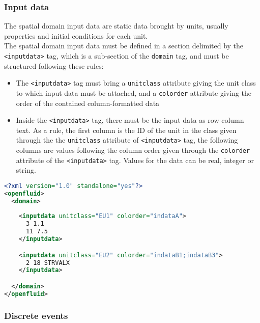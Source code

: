 \subsubsection{Input data}

The spatial domain input data are static data brought by units, usually properties and initial conditions for each unit.\\
\noindent The spatial domain input data must be defined in a section delimited
by the \texttt{<inputdata>} tag, which is a sub-section of the \texttt{domain}
tag, and must be structured following these rules:
\begin{itemize}
  \item The \texttt{<inputdata>} tag must bring a \texttt{unitclass}
  attribute giving the unit class to which input data must be attached, and a
  \texttt{colorder} attribute giving the order of the contained column-formatted
  data
  \item Inside the \texttt{<inputdata>} tag, there must be the input data as 
  row-column text. As a rule, the first column is the ID of the unit in the class
  given through the the \texttt{unitclass} attribute of \texttt{<inputdata>}
  tag, the following columns are values following the column order given
  through the \texttt{colorder} attribute of the \texttt{<inputdata>} tag.
  Values for the data can be real, integer or string.
\end{itemize}

\bigskip

\begin{lstlisting}[language=xml,title=\footnotesize\textit{example}]
<?xml version="1.0" standalone="yes"?>
<openfluid>
  <domain>
  
    <inputdata unitclass="EU1" colorder="indataA">
      3 1.1
      11 7.5
    </inputdata>

    <inputdata unitclass="EU2" colorder="indataB1;indataB3">
      2 18 STRVALX
    </inputdata>

  </domain>
</openfluid>
\end{lstlisting}


\bigskip



\bigskip

\subsubsection{Discrete events}

